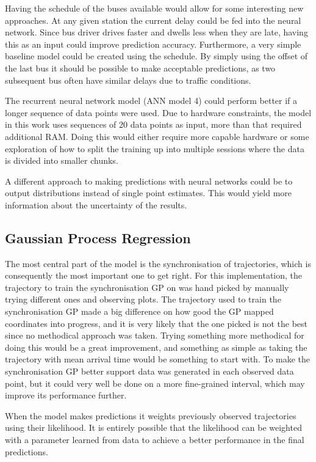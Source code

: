 Having the schedule of the buses available would allow for some interesting new approaches. At any given station the current delay could be fed into the neural network. Since bus driver drives faster and dwells less when they are late, having this as an input could improve prediction accuracy. Furthermore, a very simple baseline model could be created using the schedule. By simply using the offset of the last bus it should be possible to make acceptable predictions, as two subsequent bus often have similar delays due to traffic conditions.

The recurrent neural network model (ANN model 4) could perform better if a longer sequence of data points were used. Due to hardware constraints, the model in this work uses sequences of 20 data points as input, more than that required additional RAM. Doing this would either require more capable hardware or some exploration of how to split the training up into multiple sessions where the data is divided into smaller chunks.

A different approach to making predictions with neural networks could be to output distributions instead of single point estimates. This would yield more information about the uncertainty of the results.

\subsection{Gaussian Process Regression}
The most central part of the model is the synchronisation of trajectories, which is consequently the most important one to get right. For this implementation, the trajectory to train the synchronisation GP on was hand picked by manually trying different ones and observing plots. The trajectory used to train the synchronisation GP made a big difference on how good the GP mapped coordinates into progress, and it is very likely that the one picked is not the best since no methodical approach was taken. Trying something more methodical for doing this would be a great improvement, and something as simple as taking the trajectory with mean arrival time would be something to start with. To make the synchronisation GP better support data was generated in each observed data point, but it could very well be done on a more fine-grained interval, which may improve its performance further.

When the model makes predictions it weights previously observed trajectories using their likelihood. It is entirely possible that the likelihood can be weighted with a parameter learned from data to achieve a better performance in the final predictions.


